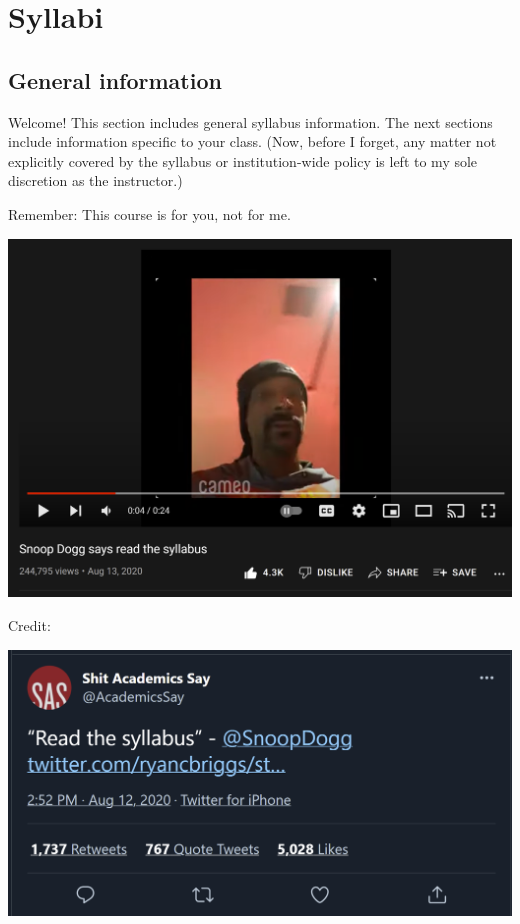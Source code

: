 \hypertarget{part-syllabi}{%
\part*{Syllabi}\label{part-syllabi}}


\hypertarget{general-information}{%
\chapter*{General information}\label{general-information}}


Welcome! This section includes general syllabus information. The next sections include information specific to your class. (Now, before I forget, any matter not explicitly covered by the syllabus or institution-wide policy is left to my sole discretion as the instructor.)

Remember: This course is for you, not for me.

\includegraphics[width=29.86in]{img/snoop}

Credit:

\includegraphics[width=19.31in]{img/AcademicsSaystatus}

